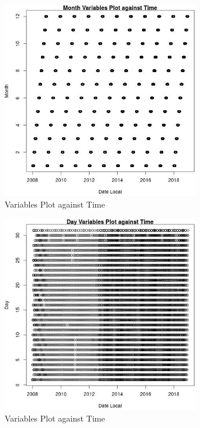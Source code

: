 \begin{figure} 
\centering  
\includegraphics[width=0.77\textwidth]{Code_Outputs/Report_PM25_Step4_part_e_de_duplicated_aves_ML_input_MonthvDate_Local.jpg} 
\caption{\label{fig:Report_PM25_Step4_part_e_de_duplicated_aves_ML_inputMonthvDate_Local}Variables Plot against Time} 
\end{figure} 
 

\begin{figure} 
\centering  
\includegraphics[width=0.77\textwidth]{Code_Outputs/Report_PM25_Step4_part_e_de_duplicated_aves_ML_input_DayvDate_Local.jpg} 
\caption{\label{fig:Report_PM25_Step4_part_e_de_duplicated_aves_ML_inputDayvDate_Local}Variables Plot against Time} 
\end{figure} 
 

